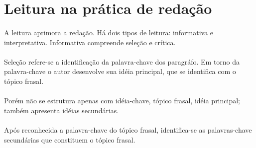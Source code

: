 \section{Leitura na prática de redação}

\paragraph{}
A leitura aprimora a redação. Há dois tipos de leitura: informativa e interpretativa. Informativa compreende seleção e crítica.

\paragraph{}
Seleção refere-se a identificação da palavra-chave dos paragráfo. Em torno da palavra-chave o autor desenvolve sua idéia principal, que se identifica com o tópico frasal.

\paragraph{}
Porém não se estrutura apenas com idéia-chave, tópico frasal, idéia principal; também apresenta idéias secundárias.

\paragraph{}
Após reconhecida a palavra-chave do tópico frasal, identifica-se as palavras-chave secundárias que constituem o tópico frasal.
